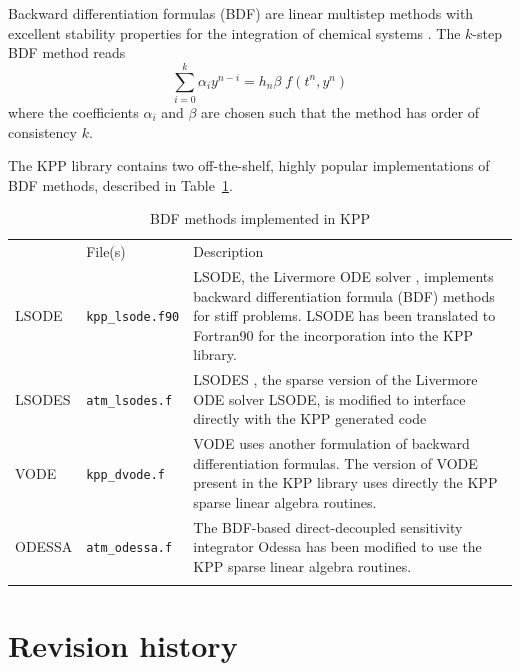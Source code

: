 \documentclass[twoside]{article}
\newcommand{\hhline}{\noalign{\vspace{1mm}}\hline\noalign{\vspace{1mm}}}
\begin{document}
Backward differentiation formulas (BDF) are linear multistep methods with
excellent stability properties for the integration of chemical systems
\citep[Section V.1]{k:HW2}.  The $k$-step BDF method reads
%
\begin{equation}
\sum_{i=0}^k \alpha_i y^{n-i} = h_n \beta\; f\left(t^{n},y^{n}\right)
\label{BDF}
\end{equation}
%
where the coefficients $\alpha_i$ and $\beta$ are chosen such that the
method has order of consistency $k$.

The KPP library contains two off-the-shelf, highly popular
implementations of BDF methods, described in Table~\ref{tab:BDF}.

\begin{table}
  \begin{center}
    \caption{BDF methods implemented in KPP}
    \label{tab:BDF}
    \begin{tabular}{lp{2cm}p{10cm}}
      \hhline
      \multicolumn{1}{c}{Method} & File(s) & Description \\
      \hhline
      LSODE & {\tt kpp\_lsode.f90} &
      LSODE, the Livermore ODE solver \citep{LSODE}, implements
      backward differentiation formula (BDF) methods for stiff problems.
      LSODE has been translated to Fortran90 for the incorporation into
      the KPP library.\\
      LSODES &{\tt atm\_lsodes.f}&
      LSODES \citep{LSODE}, the sparse version of the Livermore ODE solver
      LSODE, is modified to interface directly with the KPP generated code\\
      VODE & {\tt kpp\_dvode.f} &
      VODE \citep{VODE} uses another formulation of backward
      differentiation formulas. The version of VODE present in the KPP
      library uses directly the KPP sparse linear algebra routines.\\
      ODESSA &{\tt atm\_odessa.f}&
      The BDF-based direct-decoupled sensitivity integrator Odessa
      \citep{k:Leis86a} has been modified to use the KPP sparse linear
      algebra routines.\\
      \hhline
    \end{tabular}
  \end{center}
\end{table}

\section{Revision history}
\end{document}
